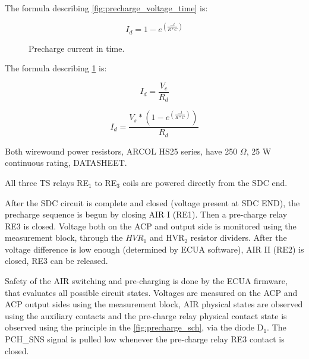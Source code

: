 The formula describing \ref{fig:precharge_voltage_time} is:

\begin{equation}
	I_{d}=1-e^{(\frac{-t}{R*C})}
	\label{eq:precharge_voltage}
\end{equation}

\begin{figure}
	\caption{Precharge current in time.}
	\label{fig:precharge_current_time}
\end{figure}


The formula describing \ref{fig:precharge_current_time} is:

\begin{equation}
	I_{d}=\frac{V_{c}}{R_{d}}	
\end{equation}

\begin{equation}
	I_{d}=\frac{V_{s}*(1-e^{(\frac{-t}{R*C})})}{R_{d}}
	\label{eq:precharge_current}
\end{equation}


Both wirewound power resistors, ARCOL HS25 series, have 250 $\Omega$, 25 W continuous rating, DATASHEET.

All three TS relays RE$_1$ to RE$_3$ coils are powered directly from the SDC end.

After the SDC circuit is complete and closed (voltage present at SDC END), the precharge sequence is begun by closing AIR I (RE1). Then a pre-charge relay RE3 is closed. Voltage both on the ACP and output side is monitored using the measurement block, through the $HVR_1$ and HVR$_2$ resistor dividers. After the voltage difference is low enough (determined by ECUA software), AIR II (RE2) is closed, RE3 can be released.

Safety of the AIR switching and pre-charging is done by the ECUA firmware, that evaluates all possible circuit states. Voltages are measured on the ACP and ACP output sides using the measurement block, AIR physical states are observed using the auxiliary contacts and the pre-charge relay physical contact state is observed using the principle in the \ref{fig:precharge_sch}, via the diode D$_1$. The PCH\_SNS signal is pulled low whenever the pre-charge relay RE3 contact is closed.

